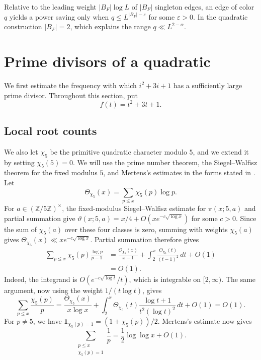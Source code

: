 \documentclass[11pt]{amsart}
\theoremstyle{definition}
\theoremstyle{remark}
\begin{document}
Relative to the leading weight $|B_F|\log L$ of $|B_F|$ singleton edges, an
edge of color $q$ yields a power saving only when
$q\leq L^{|B_F|-\varepsilon}$ for some $\varepsilon>0$.  In the quadratic
construction $|B_F|=2$, which explains the range $q\ll L^{2-\alpha}$.

\section{Prime divisors of a quadratic}

We first estimate the frequency with which $i^2+3i+1$ has a sufficiently
large prime divisor.  Throughout this section, put
\[
f(t)=t^2+3t+1.
\]

\subsection{Local root counts}

We also let $\chi_5$ be the primitive quadratic character modulo $5$, and we
extend it by setting $\chi_5(5)=0$.  We will use the prime number theorem, the
Siegel--Walfisz theorem for the fixed modulus $5$, and Mertens's estimates in
the forms stated in
\cite[Theorems 3.4, 8.1 and 12.1]{Koukoulopoulos}.  Let
\[
\Theta_{\chi_5}(x)=\sum_{p\leq x}\chi_5(p)\log p.
\]
For $a\in(\mathbb Z/5\mathbb Z)^\times$, the fixed-modulus Siegel--Walfisz
estimate for $\pi(x;5,a)$ and partial summation give
$\vartheta(x;5,a)=x/4+O(xe^{-c\sqrt{\log x}})$ for some $c>0$.  Since the
sum of $\chi_5(a)$ over these four classes is zero, summing with weights
$\chi_5(a)$ gives
$\Theta_{\chi_5}(x)\ll xe^{-c\sqrt{\log x}}$.
Partial summation therefore gives
\begin{equation}\label{eq:chi}
\begin{aligned}
\sum_{p\leq x}\chi_5(p)\frac{\log p}{p-1}
&=\frac{\Theta_{\chi_5}(x)}{x-1}
 +\int_2^x\frac{\Theta_{\chi_5}(t)}{(t-1)^2}\,dt+O(1)\\
&=O(1).
\end{aligned}
\end{equation}
Indeed, the integrand is $O(e^{-c\sqrt{\log t}}/t)$, which is integrable on
$[2,\infty)$.  The same argument, now using the weight $1/(t\log t)$,
gives
\[
\sum_{p\leq x}\frac{\chi_5(p)}p
=\frac{\Theta_{\chi_5}(x)}{x\log x}
 +\int_2^x\Theta_{\chi_5}(t)
 \frac{\log t+1}{t^2(\log t)^2}\,dt+O(1)
=O(1).
\]
For $p\neq5$, we have
$\mathbf 1_{\chi_5(p)=1}=(1+\chi_5(p))/2$.  Mertens's estimate now gives
\begin{equation}\label{eq:split}
\sum_{\substack{p\leq x\\ \chi_5(p)=1}}\frac1p
=\frac12\log\log x+O(1).
\end{equation}
\end{document}

